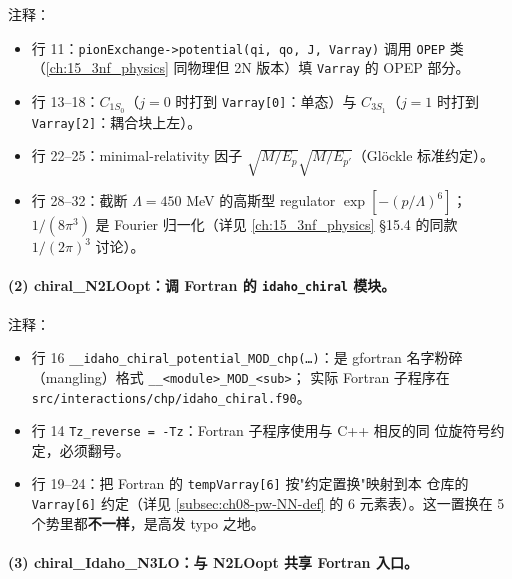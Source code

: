 注释：
\begin{itemize}
  \item 行 11：\texttt{pionExchange->potential(qi, qo, J, Varray)} 调用
        \texttt{OPEP} 类（\cref{ch:15_3nf_physics} 同物理但 2N 版本）填
        \texttt{Varray} 的 OPEP 部分。
  \item 行 13--18：\(C_{1S_0}\)（\(j=0\) 时打到 \texttt{Varray[0]}：单态）与
        \(C_{3S_1}\)（\(j=1\) 时打到 \texttt{Varray[2]}：耦合块上左）。
  \item 行 22--25：minimal-relativity 因子
        \(\sqrt{M/E_p} \sqrt{M/E_{p'}}\)（Glöckle 标准约定）。
  \item 行 28--32：截断 \(\Lambda = 450\) MeV 的高斯型 regulator
        \(\exp[-(p/\Lambda)^6]\)；\(1/(8\pi^3)\) 是 Fourier 归一化（详见
        \cref{ch:15_3nf_physics} \S 15.4 的同款 \(1/(2\pi)^3\) 讨论）。
\end{itemize}

\paragraph{(2) chiral\_N2LOopt：调 Fortran 的 \texttt{idaho\_chiral} 模块。}


注释：
\begin{itemize}
  \item 行 16 \texttt{\_\_idaho\_chiral\_potential\_MOD\_chp(\ldots)}：是
        gfortran 名字粉碎（mangling）格式 \texttt{\_\_<module>\_MOD\_<sub>}；
        实际 Fortran 子程序在 \texttt{src/interactions/chp/idaho\_chiral.f90}。
  \item 行 14 \texttt{Tz\_reverse = -Tz}：Fortran 子程序使用与 C++ 相反的同
        位旋符号约定，必须翻号。
  \item 行 19--24：把 Fortran 的 \texttt{tempVarray[6]} 按"约定置换"映射到本
        仓库的 \texttt{Varray[6]} 约定（详见 \cref{subsec:ch08-pw-NN-def}
        的 6 元素表）。这一置换在 5 个势里都\textbf{不一样}，是高发 typo
        之地。
\end{itemize}

\paragraph{(3) chiral\_Idaho\_N3LO：与 N2LOopt 共享 Fortran 入口。}


